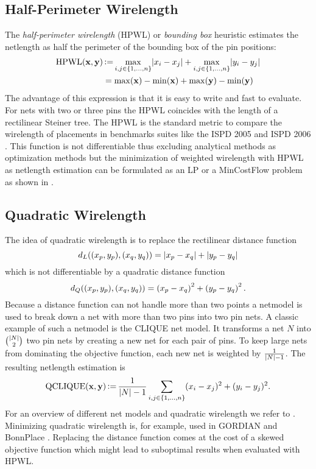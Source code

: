\subsection{Half-Perimeter Wirelength} \label{subsec:hpwl}
The \emph{half-perimeter wirelength} (HPWL) or \emph{bounding box} heuristic estimates the netlength as half the perimeter of the bounding box of the pin positions:
\begin{align*}
 \operatorname{HPWL}(\mathbf{x}, \mathbf{y}) &\operatorname{\vcentcolon=} \max_{i, j \in \{1, \ldots, n\}} \lvert x_i - x_j\rvert + \max_{i, j \in \{1, \ldots, n\}} \lvert y_i - y_j\rvert \\
                               &= \max(\mathbf{x}) - \min(\mathbf{x}) + \max(\mathbf{y}) - \min(\mathbf{y})
\end{align*}
The advantage of this expression is that it is easy to write and fast to evaluate.
For nets with two or three pins the HPWL coincides with the length of a rectilinear Steiner tree.
The HPWL is the standard metric to compare the wirelength of placements in benchmarks suites like the 
ISPD 2005 \cite{NamAlpertVillarrubiaWinterYildiz-ISPD2005BenchmarkSuite} and ISPD 2006 \cite{Nam-ISPD2006BenchmarkSuite}.
This function is not differentiable thus excluding analytical methods as optimization methods 
but the minimization of weighted wirelength with HPWL as netlength estimation can be formulated as an LP or a MinCostFlow problem
as shown in \cite[pp. 5-7]{BrennerVygen-AnalyticalMethodsInVlsiPlacement}.

\subsection{Quadratic Wirelength} \label{subsec:qp}
The idea of quadratic wirelength is to replace the rectilinear distance function
\[d_L((x_p, y_p), (x_q, y_q)) = \lvert x_p - x_q\rvert + \lvert y_p - y_q\rvert\]
which is not differentiable by a quadratic distance function 
\[d_Q((x_p, y_p), (x_q, y_q)) = \left({x_p - x_q}\right)^2 + \left({y_p - y_q}\right)^2 .\]
Because a distance function can not handle more than two points a netmodel is used to break down a net with more than two pins into two pin nets.
A classic example of such a netmodel is the CLIQUE net model.
It transforms a net \(N\) into \(\binom{\lvert N\rvert}{2}\) two pin nets by creating a new net for each pair of pins.
To keep large nets from dominating the objective function, each new net is weighted by \(\frac{1}{\lvert N\rvert-1}\).
The resulting netlength estimation is
\[ \operatorname{QCLIQUE}(\mathbf{x}, \mathbf{y}) \operatorname{\vcentcolon=} \frac{1}{\lvert N\rvert-1} \sum_{i, j \in \{1, \ldots, n\}} (x_i - x_j)^2 + (y_i - y_j)^2 . \]
For an overview of different net models and quadratic wirelength we refer to \cite{BrennerVygen-AnalyticalMethodsInVlsiPlacement}.
Minimizing quadratic wirelength is, for example, used in GORDIAN \cite{KleinhansSiglJohannesAntreich-GORDIAN} and BonnPlace \cite{BrennerStruzyna-GlobalPlacement}.
Replacing the distance function comes at the cost of a skewed objective function which might lead to suboptimal results when evaluated with HPWL.

